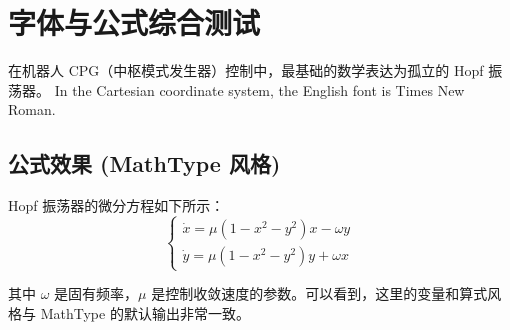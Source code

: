 \documentclass[12pt, a4paper]{ctexart}
\begin{document}
\section{字体与公式综合测试}
在机器人 CPG（中枢模式发生器）控制中，最基础的数学表达为孤立的 Hopf 振荡器。
In the Cartesian coordinate system, the English font is Times New Roman.

\subsection{公式效果 (MathType 风格)}
Hopf 振荡器的微分方程如下所示：
\begin{equation}
    \begin{cases}
        \dot{x} = \mu (1 - x^2 - y^2)x - \omega y \\
        \dot{y} = \mu (1 - x^2 - y^2)y + \omega x
    \end{cases}
\end{equation}

其中 $\omega$ 是固有频率，$\mu$ 是控制收敛速度的参数。可以看到，这里的变量和算式风格与 MathType 的默认输出非常一致。
\end{document}
